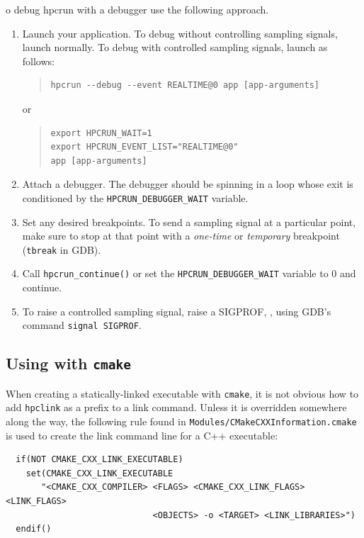 \documentclass[11pt,letterpaper]{report}
\begin{document}
o debug hpcrun with a debugger use the following approach.
\begin{enumerate}

\item Launch your application.
  To debug \hpcrun{} without controlling sampling signals, launch normally.
  To debug \hpcrun{} with controlled sampling signals, launch as follows:
\begin{quote}
\begin{verbatim}
hpcrun --debug --event REALTIME@0 app [app-arguments]
\end{verbatim}
\end{quote}
or
\begin{quote}
\begin{verbatim}
export HPCRUN_WAIT=1
export HPCRUN_EVENT_LIST="REALTIME@0"
app [app-arguments]
\end{verbatim}
\end{quote}

\item Attach a debugger.
  The debugger should be spinning in a loop whose exit is conditioned by the 
  \verb|HPCRUN_DEBUGGER_WAIT| variable.

\item Set any desired breakpoints.
  To send a sampling signal at a particular point, make sure to stop at that point with a \emph{one-time} or \emph{temporary} breakpoint (\texttt{tbreak} in GDB).

\item Call \verb|hpcrun_continue()| or set the \verb|HPCRUN_DEBUGGER_WAIT| variable to 0 
and continue.

\item To raise a controlled sampling signal, raise a SIGPROF, \eg{}, using GDB's command \verb|signal SIGPROF|.

\end{enumerate}

\subsection{Using \hpclink{} with {\tt cmake}}

When creating a statically-linked executable with {\tt cmake}, it is not obvious how to add {\tt hpclink} as a prefix to a link command. Unless it is overridden somewhere  along the way, the following rule found in {\tt Modules/CMakeCXXInformation.cmake} is
used to create the link command line for a C++ executable:

\begin{verbatim}
  if(NOT CMAKE_CXX_LINK_EXECUTABLE)
    set(CMAKE_CXX_LINK_EXECUTABLE
       "<CMAKE_CXX_COMPILER> <FLAGS> <CMAKE_CXX_LINK_FLAGS> <LINK_FLAGS> 
                             <OBJECTS> -o <TARGET> <LINK_LIBRARIES>")
  endif()
\end{verbatim}
\end{document}
